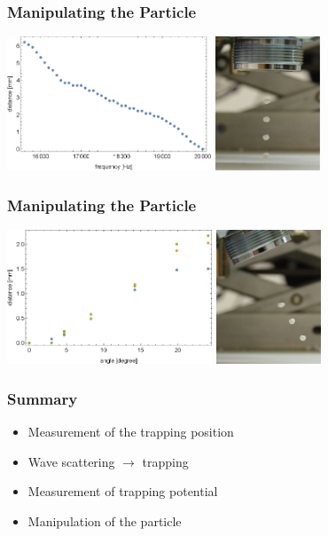 \documentclass{beamer}
\begin{document}
\begin{frame}
\frametitle{Manipulating the Particle}
\includegraphics[height=4cm]{Auswertung1}
\hspace{1cm}
\includegraphics[height=4cm]{Frequenzae}
\end{frame}

\begin{frame}
\frametitle{Manipulating the Particle}
\includegraphics[height=4cm]{Auswertung_angle}
\hspace{1cm}
\includegraphics[height=4cm]{Drehung}
\end{frame}

\begin{frame}
\frametitle{Summary}
\begin{itemize}
\item Measurement of the trapping position
\item Wave scattering $\rightarrow$ trapping
\item Measurement of trapping potential
\item Manipulation of the particle
\end{itemize}
\end{frame}
\end{document}

